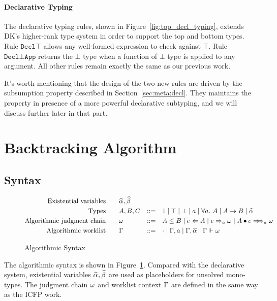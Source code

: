 \paragraph{Declarative Typing}

The declarative typing rules, shown in Figure~\ref{fig:top_decl_typing},
extends DK's higher-rank type system in order to support the top and bottom types.
Rule $\mathtt{Decl\top}$ allows any well-formed expression to check against $\top$.
Rule $\mathtt{Decl{\bot}App}$ returns the $\bot$ type
when a function of $\bot$ type is applied to any argument.
All other rules remain exactly the same as our previous work.

It's worth mentioning that the design of the two new rules
are driven by the subsumption property described in Section~\ref{sec:meta:decl}.
They maintains the property in presence of a more powerful declarative subtyping,
and we will discuss further later in that part.

\setcounter{algRuleCounter}{0}

\section{Backtracking Algorithm}

\subsection{Syntax}

\begin{figure}[t]
    \begin{gather*}
    \begin{aligned}
        \text{Existential variables}\qquad&\al, \bt\\
        \text{Types}\qquad&A, B, C &::=&\quad 1 \mid \top \mid \bot \mid a \mid \all A \mid A\to B \mid \al\\
        \text{Algorithmic judgment chain}\qquad&\jg &::=&\quad A \le B \mid e\Lto A \mid e\To_{a} \jg \mid \appInfAlg{A}{e}\\
        \text{Algorithmic worklist}\qquad&\Gm &::=&\quad \cdot \mid \Gm, a \mid \Gm, \al \mid \Gm \Vdash \jg
    \end{aligned}
    \end{gather*}
\caption{Algorithmic Syntax}\label{fig:top_alg_syntax}
\end{figure}

The algorithmic syntax is shown in Figure~\ref{fig:top_alg_syntax}.
Compared with the declarative system, existential variables $\al, \bt$ are used
as placeholders for unsolved mono-types.
The judgment chain $\omega$ and worklist context $\Gamma$ are defined in the same way as the ICFP work.

